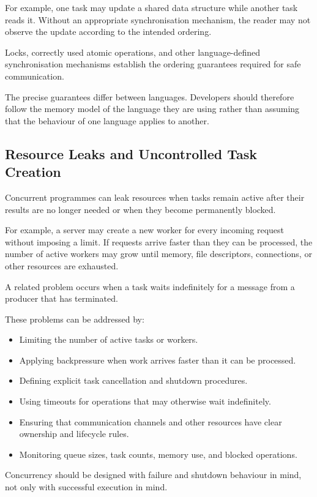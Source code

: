 For example, one task may update a shared data structure while another task reads it. Without an appropriate synchronisation mechanism, the reader may not observe the update according to the intended ordering.

Locks, correctly used atomic operations, and other language-defined synchronisation mechanisms establish the ordering guarantees required for safe communication.

The precise guarantees differ between languages. Developers should therefore follow the memory model of the language they are using rather than assuming that the behaviour of one language applies to another.

\subsection{Resource Leaks and Uncontrolled Task Creation}

Concurrent programmes can leak resources when tasks remain active after their results are no longer needed or when they become permanently blocked.

For example, a server may create a new worker for every incoming request without imposing a limit. If requests arrive faster than they can be processed, the number of active workers may grow until memory, file descriptors, connections, or other resources are exhausted.

A related problem occurs when a task waits indefinitely for a message from a producer that has terminated.

These problems can be addressed by:

\begin{itemize}
    \item Limiting the number of active tasks or workers.
    \item Applying backpressure when work arrives faster than it can be processed.
    \item Defining explicit task cancellation and shutdown procedures.
    \item Using timeouts for operations that may otherwise wait indefinitely.
    \item Ensuring that communication channels and other resources have clear ownership and lifecycle rules.
    \item Monitoring queue sizes, task counts, memory use, and blocked operations.
\end{itemize}

Concurrency should be designed with failure and shutdown behaviour in mind, not only with successful execution in mind.

